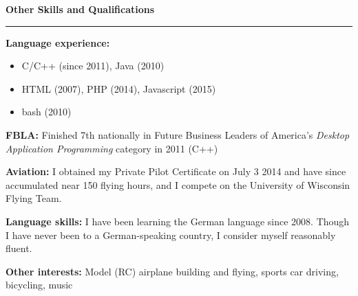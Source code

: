\documentclass[12pt,letterpaper]{article}
\newenvironment{details}{
    \vspace{-.5em}
    \begin{itemize}
        \renewcommand \labelitemi{\labelitemiv}
        \setlength{\itemsep}{0pt}
        \setlength{\parskip}{-1pt}
        \setlength{\parsep}{0pt}
    }{
    \end{itemize}
    \vspace{-.5em}
}
\newcommand{\hr} {
    \vspace{-1em}
    \par\rule{\textwidth}{1pt}
    \vspace{-1.5em}
}
\newcommand{\ressection}[1] {
    \par{\large \textbf{#1}}
    \hr
}
\newenvironment{other} {
    \ressection{Other Skills and Qualifications}
    \setlength{\parskip}{3pt}
}{
    \vspace{0.5em}
}
\begin{document}
\begin{other}
\par \textbf{Language experience:}
\vspace{-.5em}
\begin{details}
    \item C/C++ (since 2011), Java (2010)
    \item HTML (2007), PHP (2014), Javascript (2015)
    \item bash (2010)
\end{details}
\par \textbf{FBLA:} Finished 7th nationally in Future Business Leaders of America's \textit{Desktop Application Programming} category in 2011 (C++)

\par \textbf{Aviation:} I obtained my Private Pilot Certificate on July 3 2014 and have since accumulated near 150 flying hours, and I compete on the University of Wisconsin Flying Team.

\par \textbf{Language skills:} I have been learning the German language since 2008.  Though I have never been to a German-speaking country, I consider myself reasonably fluent.

\par \textbf{Other interests:} Model (RC) airplane building and flying, sports car driving, bicycling, music

\end{other}
\end{document}
